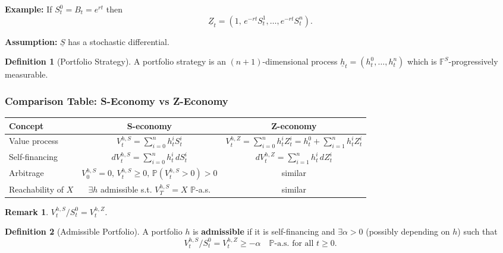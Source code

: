 \documentclass[12pt,a4paper]{article}
\theoremstyle{definition}
\newtheorem{definition}{Definition}[section]
\newtheorem{remark}{Remark}[section]
\begin{document}
\textbf{Example:} If $S_t^0 = B_t = e^{rt}$ then
\[
\underline{Z}_t = \left(1, \, e^{-rt} S_t^1, \ldots, e^{-rt} S_t^n\right).
\]

\textbf{Assumption:} $\underline{S}$ has a stochastic differential.

\begin{definition}[Portfolio Strategy]
A portfolio strategy is an $(n+1)$-dimensional process $\underline{h}_t = (h_t^0, \ldots, h_t^n)$ which is $\mathbb{F}^S$-progressively measurable.
\end{definition}

\subsubsection{Comparison Table: S-Economy vs Z-Economy}

\begin{center}
\begin{tabular}{|l|c|c|}
\hline
\textbf{Concept} & \textbf{S-economy} & \textbf{Z-economy} \\
\hline
\hline
Value process & $\displaystyle V_t^{h,S} = \sum_{i=0}^n h_t^i S_t^i$ & $\displaystyle V_t^{h,Z} = \sum_{i=0}^n h_t^i Z_t^i = h_t^0 + \sum_{i=1}^n h_t^i Z_t^i$ \\[1.5em]
\hline
Self-financing & $\displaystyle dV_t^{h,S} = \sum_{i=0}^n h_t^i \, dS_t^i$ & $\displaystyle dV_t^{h,Z} = \sum_{i=1}^n h_t^i \, dZ_t^i$ \\[1.5em]
\hline
Arbitrage & $V_0^{h,S} = 0, \, V_t^{h,S} \geq 0, \, \mathbb{P}(V_t^{h,S} > 0) > 0$ & similar \\[0.5em]
\hline
Reachability of $X$ & $\exists h$ admissible s.t. $V_T^{h,S} = X$ $\mathbb{P}$-a.s. & similar \\[0.5em]
\hline
\end{tabular}
\end{center}

\vspace{1em}

\begin{remark}
$V_t^{h,S} / S_t^0 = V_t^{h,Z}$.
\end{remark}

\begin{definition}[Admissible Portfolio]
A portfolio $h$ is \textbf{admissible} if it is self-financing and $\exists \alpha > 0$ (possibly depending on $h$) such that
\[
V_t^{h,S} / S_t^0 = V_t^{h,Z} \geq -\alpha \quad \mathbb{P}\text{-a.s. for all } t \geq 0.
\]
\end{definition}
\end{document}
